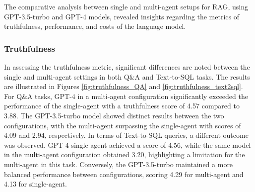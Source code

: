             The comparative analysis between single and multi-agent setups for RAG, using GPT-3.5-turbo and GPT-4 models, revealed insights regarding the metrics of truthfulness, performance, and costs of the language model.


            \subsubsection{Truthfulness} 

                In assessing the truthfulness metric, significant differences are noted between the single and multi-agent settings in both Q\&A and Text-to-SQL tasks. The results are illustrated in Figures \ref{fig:truthfulness_QA} and \ref{fig:truthfulness_text2sql}.
                For Q\&A tasks, GPT-4 in a multi-agent configuration significantly exceeded the performance of the single-agent with a truthfulness score of 4.57 compared to 3.88. The GPT-3.5-turbo model showed distinct results between the two configurations, with the multi-agent surpassing the single-agent with scores of 4.09 and 2.94, respectively.
                In terms of Text-to-SQL queries, a different outcome was observed. GPT-4 single-agent achieved a score of 4.56, while the same model in the multi-agent configuration obtained 3.20, highlighting a limitation for the multi-agent in this task. Conversely, the GPT-3.5-turbo maintained a more balanced performance between configurations, scoring 4.29 for multi-agent and 4.13 for single-agent.
                
